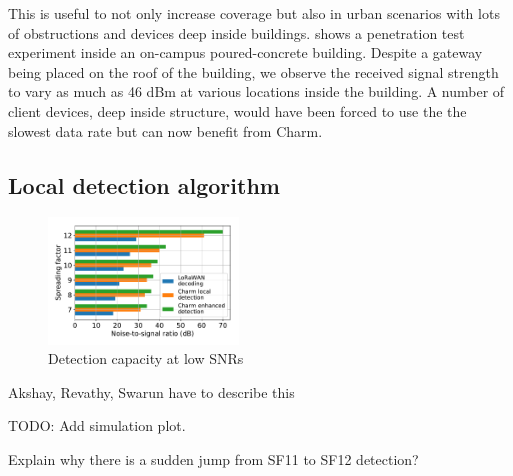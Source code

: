 This is useful to not only increase coverage but also in urban scenarios with lots of obstructions and devices deep inside buildings.  shows a penetration test experiment inside an on-campus poured-concrete building. Despite a gateway being placed on the roof of the building, we observe the received signal strength to vary as much as 46 dBm at various locations inside the building. A number of client devices, deep inside structure, would have been forced to use the the slowest data rate but can now benefit from Charm.

\subsection{Local detection algorithm}
\label{sec:local-detection-eval}

\begin{figure}[!ht]
\centering
\includegraphics[width=0.45\textwidth]{figures/local_detection_limits}
\caption{Detection capacity at low SNRs}
\label{fig:local-detection}
\end{figure}

{\color{blue} Akshay, Revathy, Swarun have to describe this

TODO: Add simulation plot.

Explain why there is a sudden jump from SF11 to SF12 detection?}

